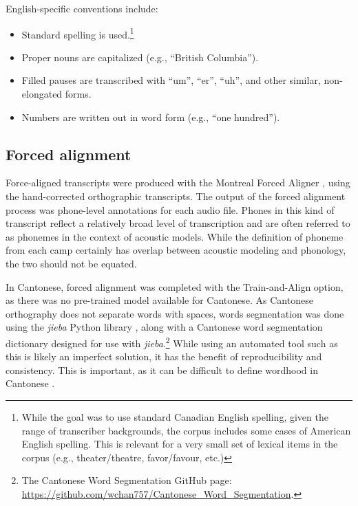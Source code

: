 English-specific conventions include:
\begin{itemize}
 \item Standard spelling is used.\footnote{While the goal was to use standard Canadian English spelling, given the range of transcriber backgrounds, the corpus includes some cases of American English spelling. This is relevant for a very small set of lexical items in the corpus (e.g., theater/theatre, favor/favour, etc.) }
 \item Proper nouns are capitalized (e.g., ``British Columbia''). 
 \item Filled pauses are transcribed with ``um'', ``er'', ``uh'', and other similar, non-elongated forms.
 \item Numbers are written out in word form (e.g., ``one hundred'').
\end{itemize}

\subsection{Forced alignment}\label{ch2:subsec:alignment}
Force-aligned transcripts were produced with the Montreal Forced Aligner \citep{mcauliffe_2017_mfa}, using the hand-corrected orthographic transcripts. The output of the forced alignment process was phone-level annotations for each audio file. Phones in this kind of transcript reflect a relatively broad level of transcription and are often referred to as phonemes in the context of acoustic models. While the definition of phoneme from each camp certainly has overlap between acoustic modeling and phonology, the two should not be equated.

In Cantonese, forced alignment was completed with the Train-and-Align option, as there was no pre-trained model available for Cantonese. As Cantonese orthography does not separate words with spaces, words segmentation was done using the \textit{jieba} Python library \citep{sun_2020_jieba}, along with a Cantonese word segmentation dictionary designed for use with \textit{jieba}.\footnote{The Cantonese Word Segmentation GitHub page: \url{https://github.com/wchan757/Cantonese_Word_Segmentation}.} While using an automated tool such as this is likely an imperfect solution, it has the benefit of reproducibility and consistency. This is important, as it can be difficult to define wordhood in Cantonese \citep[e.g., see][]{wong_2006_fusion}.

